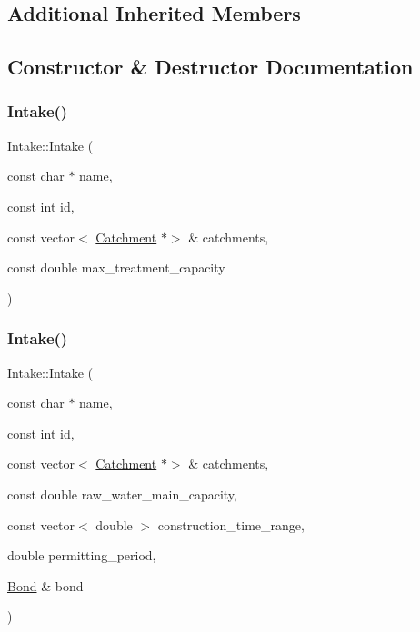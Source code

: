\subsection*{Additional Inherited Members}


\subsection{Constructor \& Destructor Documentation}
\mbox{\label{classIntake_a02e01801fcaede46e960d497e60eb335_a02e01801fcaede46e960d497e60eb335}} 
\subsubsection{\texorpdfstring{Intake()}{Intake()}\hspace{0.1cm}{\footnotesize\ttfamily [1/3]}}
{\footnotesize\ttfamily Intake\+::\+Intake (\begin{DoxyParamCaption}\item[{const char $\ast$}]{name,  }\item[{const int}]{id,  }\item[{const vector$<$ \mbox{\hyperlink{classCatchment}{Catchment}} $\ast$$>$ \&}]{catchments,  }\item[{const double}]{max\+\_\+treatment\+\_\+capacity }\end{DoxyParamCaption})}

\mbox{\label{classIntake_a41f51ae340129c31a4b2067c9f8ca0f9_a41f51ae340129c31a4b2067c9f8ca0f9}} 
\subsubsection{\texorpdfstring{Intake()}{Intake()}\hspace{0.1cm}{\footnotesize\ttfamily [2/3]}}
{\footnotesize\ttfamily Intake\+::\+Intake (\begin{DoxyParamCaption}\item[{const char $\ast$}]{name,  }\item[{const int}]{id,  }\item[{const vector$<$ \mbox{\hyperlink{classCatchment}{Catchment}} $\ast$$>$ \&}]{catchments,  }\item[{const double}]{raw\+\_\+water\+\_\+main\+\_\+capacity,  }\item[{const vector$<$ double $>$}]{construction\+\_\+time\+\_\+range,  }\item[{double}]{permitting\+\_\+period,  }\item[{\mbox{\hyperlink{classBond}{Bond}} \&}]{bond }\end{DoxyParamCaption})}

